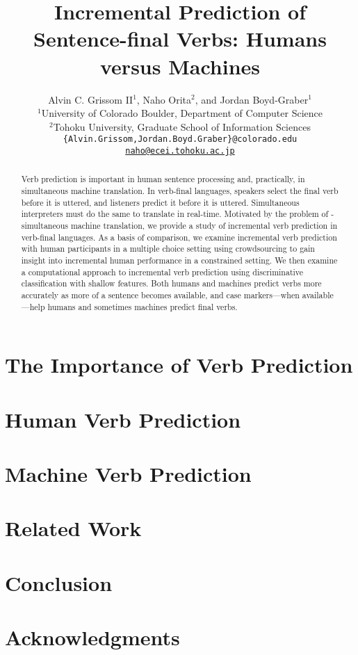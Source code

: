 \documentclass[11pt]{article}
\title{Incremental Prediction of Sentence-final Verbs: Humans versus Machines}
\author{
  Alvin C. {Grissom II}$^{1}$, Naho Orita$^{2}$, and Jordan {Boyd-Graber}$^{1}$\\
  $^1$University of Colorado Boulder, Department of Computer Science \\
  $^2$Tohoku University, Graduate School of Information Sciences \\
  {\tt\small\{Alvin.Grissom,Jordan.Boyd.Graber\}@colorado.edu}\\
   {\tt\small \protect\url{naho@ecei.tohoku.ac.jp}}\\
}
\date{}
\begin{document}
\maketitle

\begin{abstract}
  Verb prediction is important in human sentence processing and,
  practically, in simultaneous machine translation.  In verb-final
  languages, speakers select the final verb before it is uttered, and
  listeners predict it before it is uttered. Simultaneous interpreters
  must do the same to translate in real-time.  Motivated by the
  problem of - simultaneous machine translation, we
  provide a study of incremental verb prediction in verb-final
  languages. As a basis of comparison, we examine incremental verb
  prediction with human participants in a multiple choice setting
  using crowdsourcing to gain insight into incremental human
  performance in a constrained setting.  We then examine a
  computational approach to incremental verb prediction using
  discriminative classification with shallow features.  Both humans
  and machines predict verbs more accurately as more of a sentence
  becomes available, and case markers---when available---help humans
  and sometimes machines predict final verbs.
\end{abstract}
\begin{CJK}{UTF8}{min}

\section{The Importance of Verb Prediction}



\section{Human Verb Prediction}
\label{sec:human}



\section{Machine Verb Prediction}
\label{sec:language_model}



\clearpage

\section{Related Work}
\label{sec:related}


\section{Conclusion}
\label{sec:conclusion}


\section{Acknowledgments}

\end{CJK}

\clearpage



\end{document}

